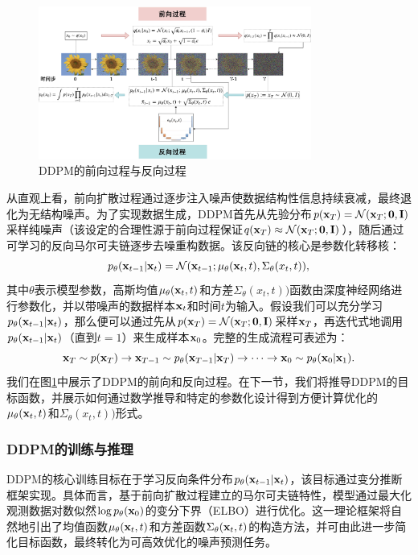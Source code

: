 \documentclass[11pt,a4paper,UTF8]{ctexart}
\begin{document}
\begin{figure}[tbp]
\centering
\includegraphics[width=0.8\textwidth]{img/DDPM.jpg}
\caption{DDPM的前向过程与反向过程}
\label{fig:ddpm}
\end{figure}

从直观上看，前向扩散过程通过逐步注入噪声使数据结构性信息持续衰减，最终退化为无结构噪声。为了实现数据生成，DDPM首先从先验分布$p(\mathbf{x}_T)=\mathcal{N}(\mathbf{x}_T;\mathbf{0},\mathbf{I})$采样纯噪声（该设定的合理性源于前向过程保证$q(\mathbf{x}_T) \approx \mathcal{N}(\mathbf{x}_T; \mathbf{0}, \mathbf{I})$），随后通过可学习的反向马尔可夫链逐步去噪重构数据。该反向链的核心是参数化转移核：
\begin{equation}
    p_{\theta}(\mathbf{x}_{t-1}|\mathbf{x}_t) = \mathcal{N}(\mathbf{x}_{t-1};\mu_{\theta}(\mathbf{x}_t,t),\Sigma_{\theta}(x_t,t)),
\label{ddpm:reverse_gaussian}
\end{equation}
其中$\theta$表示模型参数，高斯均值$\mu_{\theta}(\mathbf{x}_t,t)$和方差$\Sigma_{\theta}(x_t,t))$函数由深度神经网络进行参数化，并以带噪声的数据样本$\mathbf{x}_t$和时间$t$为输入。假设我们可以充分学习$p_{\theta}(\mathbf{x}_{t-1}|\mathbf{x}_t)$，那么便可以通过先从$p(\mathbf{x}_T)=\mathcal{N}(\mathbf{x}_T;\mathbf{0},\mathbf{I})$采样$\mathbf{x}_T$，再迭代式地调用$p_{\theta}(\mathbf{x}_{t-1}|\mathbf{x}_t)$（直到$t=1$）来生成样本$\mathbf{x}_0$。完整的生成流程可表述为：
\begin{equation*}
\mathbf{x}_T \sim p(\mathbf{x}_T) \rightarrow \mathbf{x}_{T-1} \sim p_{\theta}(\mathbf{x}_{T-1}|\mathbf{x}_T) \rightarrow \cdots \rightarrow \mathbf{x}_0 \sim p_{\theta}(\mathbf{x}_0|\mathbf{x}_1).
\end{equation*}
我们在图\ref{fig:ddpm}中展示了DDPM的前向和反向过程。在下一节，我们将推导DDPM的目标函数，并展示如何通过数学推导和特定的参数化设计得到方便计算优化的$\mu_{\theta}(\mathbf{x}_t,t)$和$\Sigma_{\theta}(x_t,t))$形式。


\subsubsection{DDPM的训练与推理}

DDPM的核心训练目标在于学习反向条件分布$p_{\theta}(\mathbf{x}_{t-1}|\mathbf{x}_t)$，该目标通过变分推断框架实现\cite{sohldickstein2015diffusion}。具体而言，基于前向扩散过程建立的马尔可夫链特性，模型通过最大化观测数据对数似然$\log p_{\theta}(\mathbf{x}_0)$的变分下界（ELBO）进行优化。这一理论框架将自然地引出了均值函数$\mu_{\theta}(\mathbf{x}_t,t)$和方差函数$\Sigma_{\theta}(\mathbf{x}_t,t)$的构造方法，并可由此进一步简化目标函数，最终转化为可高效优化的噪声预测任务\cite{ho2020denoising}。
\end{document}
